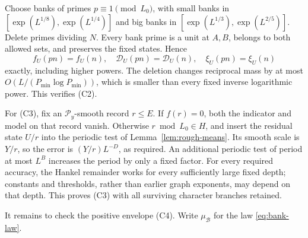 Choose banks of primes \(p\equiv1\pmod{L_0}\), with small banks in
\([\exp(L^{1/8}),\exp(L^{1/4})]\) and big banks in
\([\exp(L^{1/3}),\exp(L^{2/5})]\). Delete primes dividing \(N\).
Every bank prime is a unit at \(A,B\), belongs to both allowed
sets, and preserves the fixed states. Hence
\begin{equation}\label{eq:exact-invariance}
 f_U(pn)=f_U(n),\quad \mathcal D_U(pn)=\mathcal D_U(n),\quad \xi_U(pn)=\xi_U(n)
\end{equation}
exactly, including higher powers. The deletion changes reciprocal
mass by at most \(O(L/(P_{\min}\log P_{\min}))\), which is smaller
than every fixed inverse logarithmic power. This verifies (C2).

For (C3), fix an \(\mathcal P_y\)-smooth record \(r\le E\). If \(f(r)=0\),
both the indicator and model on that record vanish. Otherwise
\(r\bmod L_0\in H\), and insert the residual state \(U/r\)
into the periodic test of Lemma~\ref{lem:rough-means}. Its smooth
scale is \(Y/r\), so the error is \((Y/r)L^{-D}\), as required.
An additional periodic test of period at most \(L^B\) increases the
period by only a fixed factor. For every required accuracy, the
Hankel remainder works for every sufficiently large fixed depth;
constants and thresholds, rather than earlier graph exponents, may
depend on that depth. This proves (C3) with all surviving character
branches retained.

It remains to check the positive envelope (C4). Write
\(\mu_{\mathcal B}\) for the law \eqref{eq:bank-law}.

